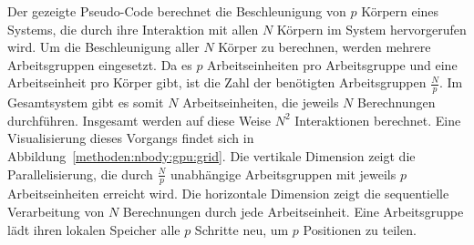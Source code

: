 
Der gezeigte Pseudo-Code berechnet die Beschleunigung von $p$ Körpern eines
Systems, die durch ihre Interaktion mit allen $N$ Körpern im System
hervorgerufen wird. Um die Beschleunigung aller $N$ Körper zu berechnen, werden
mehrere Arbeitsgruppen eingesetzt. Da es $p$ Arbeitseinheiten pro Arbeitsgruppe
und eine Arbeitseinheit pro Körper gibt, ist die Zahl der benötigten
Arbeitsgruppen $\frac{N}{p}$. Im Gesamtsystem gibt es somit $N$
Arbeitseinheiten, die jeweils $N$ Berechnungen durchführen. Insgesamt werden
auf diese Weise $N^2$ Interaktionen berechnet. Eine Visualisierung dieses
Vorgangs findet sich in Abbildung~\ref{methoden:nbody:gpu:grid}. Die vertikale
Dimension zeigt die Parallelisierung, die durch $\frac{N}{p}$ unabhängige
Arbeitsgruppen mit jeweils $p$ Arbeitseinheiten erreicht wird. Die horizontale
Dimension zeigt die sequentielle Verarbeitung von $N$ Berechnungen durch jede
Arbeitseinheit. Eine Arbeitsgruppe lädt ihren lokalen Speicher alle $p$ Schritte
neu, um $p$ Positionen zu teilen.

